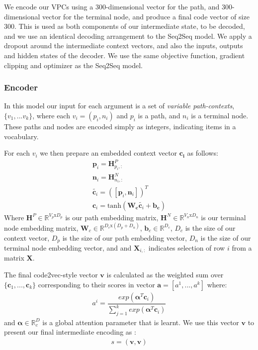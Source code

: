 We encode our VPCs using a 300-dimensional vector for the path, and 300-dimensional vector for the terminal node, and produce a final code vector of size 300.
This is used as both components of our intermediate state, to be decoded, and we use an identical decoding arrangement to the Seq2Seq model.
We apply a dropout around the intermediate context vectors, and also the inputs, outputs and hidden states of the decoder. 
We use the same objective function, gradient clipping and optimizer as the Seq2Seq model.

\subsubsection{Encoder}

In this model our input for each argument is a set of \textit{variable path-contexts}, $\{v_1,...v_k\}$, where each $v_i = (p_i, n_i)$ and  $p_i$ is a path, and $n_i$ is a terminal node. These paths and nodes are encoded simply as integers, indicating items in a vocabulary.

For each $v_i$ we then prepare an embedded context vector $\mathbf{c_i}$ as follows:
\begin{align}
\textbf{p}_i = \mathbf{H}^P_{p_i,:}\\
\textbf{n}_i = \mathbf{H}^N_{n_i,:}\\
\tilde{\textbf{c}_i} = ([\textbf{p}_i , \textbf{n}_i])^T \\
\textbf{c}_i = \text{tanh}(\mathbf{W_c}\tilde{\textbf{c}_i}  + \mathbf{b_c})
\end{align}
Where  $\textbf{H}^P \in \mathbb{R}^{V_p\text{x}D_p}$ is our path embedding matrix, 
$\textbf{H}^N \in \mathbb{R}^{V_n\text{x}D_n}$ is our terminal node embedding matrix, 
$\textbf{W}_c \in \mathbb{R}^{D_c\text{x}(D_p+D_n)}$,
$\textbf{b}_c \in \mathbb{R}^{D_c}$,
$D_c$ is the size of our context vector,
$D_p$ is the size of our path embedding vector,
$D_n$ is the size of our terminal node embedding vector, and
and $\textbf{X}_{i,:}$ indicates selection of row $i$ from a matrix \textbf{X}.

The final code2vec-style vector $\textbf{v}$ is calculated as the weighted sum over  $\{\textbf{c}_1,...,\textbf{c}_k\}$ corresponding to their scores in vector $\textbf{a} = [a^1,...,a^k]$ where:
\begin{align}
    a^i = \dfrac{exp(\mathbf{\alpha}^{T}\mathbf{c}_i)}{\sum_{j=1}^kexp(\mathbf{\alpha}^{T}\mathbf{c}_i)}
\end{align}
and $\mathbf{\alpha} \in \mathbb{R}^D_c$ is a global attention parameter that is learnt.
We use this vector $\mathbf{v}$ to present our final intermediate encoding as :
\begin{align}
     s = (\mathbf{v}, \mathbf{v}) 
\end{align}

